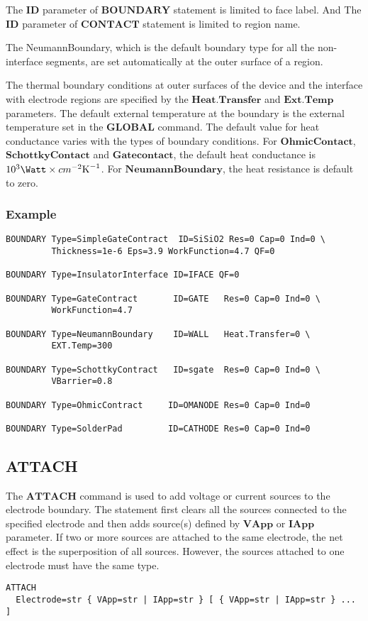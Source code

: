 \documentclass[oneside,12pt]{cgd_book}
\begin{document}
\par
The $\mathbf{ID}$ parameter of $\mathbf{BOUNDARY}$ statement is limited to face
          label. And The $\mathbf{ID}$ parameter of $\mathbf{CONTACT}$
statement is limited to
          region name.
\par
The NeumannBoundary, which is the default boundary type for all the non-interface segments, are set
          automatically at the outer surface of a region.
\par
The thermal boundary conditions at outer surfaces of the device and the interface with electrode regions
          are specified by the $\mathbf{Heat.Transfer}$ and $\mathbf{Ext.Temp}$
parameters. The
          default external temperature at the boundary is the external temperature set in the
$\mathbf{GLOBAL}$ command. The default value for heat conductance varies with the types of boundary conditions. For
$\mathbf{OhmicContact}$, $\mathbf{SchottkyContact}$ and $\mathbf{Gatecontact}$, the default heat conductance is
$10^3
          \Watt\times cm^{-2} {\Kelvin}^{-1}$. For $\mathbf{NeumannBoundary}$, the heat
          resistance is default to zero.
\par
\subsubsection{Example}
\begin{lstlisting}[style=GeniusCode]
BOUNDARY Type=SimpleGateContract  ID=SiSiO2 Res=0 Cap=0 Ind=0 \
         Thickness=1e-6 Eps=3.9 WorkFunction=4.7 QF=0

BOUNDARY Type=InsulatorInterface ID=IFACE QF=0

BOUNDARY Type=GateContract       ID=GATE   Res=0 Cap=0 Ind=0 \
         WorkFunction=4.7

BOUNDARY Type=NeumannBoundary    ID=WALL   Heat.Transfer=0 \
         EXT.Temp=300

BOUNDARY Type=SchottkyContract   ID=sgate  Res=0 Cap=0 Ind=0 \
         VBarrier=0.8

BOUNDARY Type=OhmicContract     ID=OMANODE Res=0 Cap=0 Ind=0

BOUNDARY Type=SolderPad         ID=CATHODE Res=0 Cap=0 Ind=0
\end{lstlisting}
\subsection{ATTACH}
The $\mathbf{ATTACH}$
command is used to add voltage or current sources to the electrode
        boundary. The statement first clears all the sources connected to the specified electrode and then adds
        source(s) defined by $\mathbf{VApp}$ or $\mathbf{IApp}$ parameter. If two or more
        sources are attached to the same electrode, the net effect is the superposition of all sources. However, the
        sources attached to one electrode must have the same type.
\begin{lstlisting}[style=GeniusCmd]
ATTACH
  Electrode=str { VApp=str | IApp=str } [ { VApp=str | IApp=str } ... ]
\end{lstlisting}
\par
\end{document}
